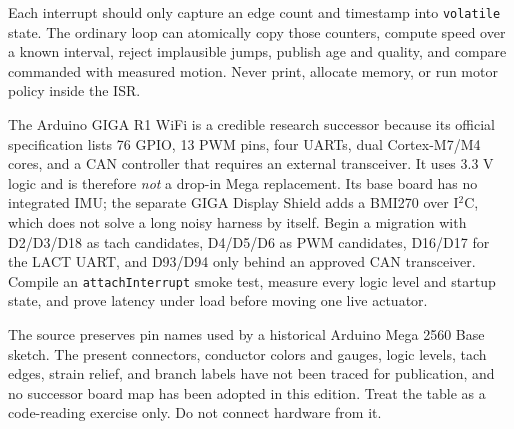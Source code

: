 \documentclass[11pt,openany]{book}
\begin{document}
Each interrupt should only capture an edge count and timestamp into \texttt{volatile} state. The ordinary loop can atomically copy those counters, compute speed over a known interval, reject implausible jumps, publish age and quality, and compare commanded with measured motion. Never print, allocate memory, or run motor policy inside the ISR.

\begin{advancedbox}[title={SUCCESSOR CONTROLLER CANDIDATE}]
The Arduino GIGA R1 WiFi is a credible research successor because its official specification lists 76 GPIO, 13 PWM pins, four UARTs, dual Cortex-M7/M4 cores, and a CAN controller that requires an external transceiver. It uses 3.3 V logic and is therefore \emph{not} a drop-in Mega replacement. Its base board has no integrated IMU; the separate GIGA Display Shield adds a BMI270 over I$^2$C, which does not solve a long noisy harness by itself. Begin a migration with D2/D3/D18 as tach candidates, D4/D5/D6 as PWM candidates, D16/D17 for the LACT UART, and D93/D94 only behind an approved CAN transceiver. Compile an \texttt{attachInterrupt} smoke test, measure every logic level and startup state, and prove latency under load before moving one live actuator.
\end{advancedbox}


\begin{fieldnotebox}[title={FIRMWARE PINS ARE NOT A HARNESS DRAWING}]
The source preserves pin names used by a historical Arduino Mega 2560 Base sketch. The present connectors, conductor colors and gauges, logic levels, tach edges, strain relief, and branch labels have not been traced for publication, and no successor board map has been adopted in this edition. Treat the table as a code-reading exercise only. Do not connect hardware from it.
\end{fieldnotebox}


\end{document}

